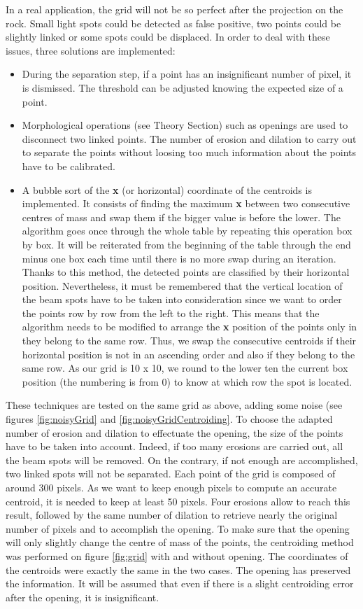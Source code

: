 In a real application, the grid will not be so perfect after the projection on the rock. Small light spots could be detected as false positive, two points could be slightly linked or some spots could be displaced. In order to deal with these issues, three solutions are implemented: 
\begin{itemize}
\item During the separation step, if a point has an insignificant number of pixel, it is dismissed. The threshold can be adjusted knowing the expected size of a point. 
\item Morphological operations (see Theory Section) such as openings are used to disconnect two linked points. The number of erosion and dilation to carry out to separate the points without loosing too much information about the points have to be calibrated. 
\item A bubble sort of the \textbf{x} (or horizontal) coordinate of the centroids is implemented. It consists of finding the maximum \textbf{x} between two consecutive centres of mass and swap them if the bigger value is before the lower. The algorithm goes once through the whole table by repeating this operation box by box. It will be reiterated from the beginning of the table through the end minus one box each time until there is no more swap during an iteration. Thanks to this method, the detected points are classified by their horizontal position. Nevertheless, it must be remembered that the vertical location of the beam spots have to be taken into consideration since we want to order the points row by row from the left to the right. This means that the algorithm needs to be modified to arrange the \textbf{x} position of the points only in they belong to the same row. Thus, we swap the consecutive centroids if their horizontal position is not in an ascending order and also if they belong to the same row. As our grid is 10 x 10, we round to the lower ten the current box position (the numbering is from 0) to know at which row the spot is located.
\end{itemize}

These techniques are tested on the same grid as above, adding some noise (see figures \ref{fig:noisyGrid} and \ref{fig:noisyGridCentroiding}. To choose the adapted number of erosion and dilation to effectuate the opening, the size of the points have to be taken into account. Indeed, if too many erosions are carried out, all the beam spots will be removed. On the contrary, if not enough are accomplished, two linked spots will not be separated. Each point of the grid is composed of around 300 pixels.  As we want to keep enough pixels to compute an accurate centroid, it is needed to keep at least 50 pixels. Four erosions allow to reach this result, followed by the same number of dilation to retrieve nearly the original number of pixels and to accomplish the opening. To make sure that the opening will only slightly change the centre of mass of the points, the centroiding method was performed on figure \ref{fig:grid} with and without opening. The coordinates of the centroids were exactly the same in the two cases. The opening has preserved the information. It will be assumed that even if there is a slight centroiding error after the opening, it is insignificant.


